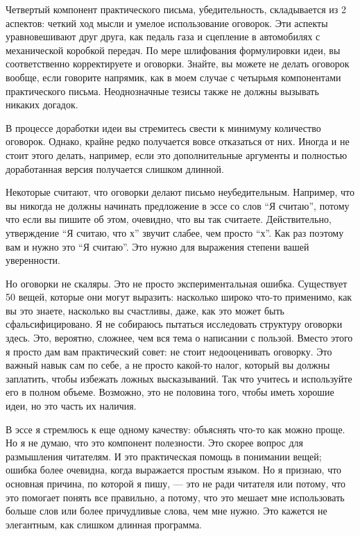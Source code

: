 \documentclass[ebook,12pt,oneside,openany]{memoir}
\begin{document}
Четвертый компонент практического письма, убедительность, складывается
из 2 аспектов: четкий ход мысли и умелое использование оговорок. Эти
аспекты уравновешивают друг друга, как педаль газа и сцепление в
автомобилях с механической коробкой передач. По мере шлифования
формулировки идеи, вы соответственно корректируете и оговорки. Знайте,
вы можете не делать оговорок вообще, если говорите напрямик, как в
моем случае с четырьмя компонентами практического письма.
Неоднозначные тезисы также не должны вызывать никаких догадок.

В процессе доработки идеи вы стремитесь свести к минимуму количество
оговорок. Однако, крайне редко получается вовсе отказаться от них.
Иногда и не стоит этого делать, например, если это дополнительные
аргументы и полностью доработанная версия получается слишком длинной.

Некоторые считают, что оговорки делают письмо неубедительным.
Например, что вы никогда не должны начинать предложение в эссе со слов
“Я считаю”, потому что если вы пишите об этом, очевидно, что вы так
считаете. Действительно, утверждение “Я считаю, что х” звучит слабее,
чем просто “х”. Как раз поэтому вам и нужно это “Я считаю”. Это нужно
для выражения степени вашей уверенности.

Но оговорки не скаляры. Это не просто экспериментальная ошибка.
Существует 50 вещей, которые они могут выразить: насколько широко
что-то применимо, как вы это знаете, насколько вы счастливы, даже, как
это может быть сфальсифицировано. Я не собираюсь пытаться исследовать
структуру оговорки здесь. Это, вероятно, сложнее, чем вся тема о
написании с пользой. Вместо этого я просто дам вам практический совет:
не стоит недооценивать оговорку. Это важный навык сам по себе, а не
просто какой-то налог, который вы должны заплатить, чтобы избежать
ложных высказываний. Так что учитесь и используйте его в полном
объеме. Возможно, это не половина того, чтобы иметь хорошие идеи, но
это часть их наличия.

В эссе я стремлюсь к еще одному качеству: объяснять что-то как можно
проще. Но я не думаю, что это компонент полезности. Это скорее вопрос
для размышления читателям. И это практическая помощь в понимании
вещей; ошибка более очевидна, когда выражается простым языком. Но я
признаю, что основная причина, по которой я пишу, — это не ради
читателя или потому, что это помогает понять все правильно, а потому,
что это мешает мне использовать больше слов или более причудливые
слова, чем мне нужно. Это кажется не элегантным, как слишком длинная
программа.
\end{document}
